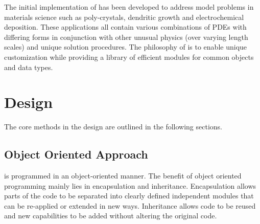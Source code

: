 % 

The initial implementation of \FiPy{} has been developed to address
model problems in materials science such as poly-crystals, dendritic
growth and electrochemical deposition. These applications all contain
various combinations of PDEs with differing forms in conjunction with
other unusual physics (over varying length scales) and unique solution
procedures. The philosophy of \FiPy{} is to enable unique
customization while providing a library of efficient modules for
common objects and data types.

\section{Design}

The core methods in the \FiPy{} design are outlined in the following
sections.

\subsection{Object Oriented Approach}

\FiPy{} is programmed in an object-oriented manner.  The benefit of
object oriented programming mainly lies in encapsulation and
inheritance.  Encapsulation allows parts of the code to be separated
into clearly defined independent modules that can be re-applied or
extended in new ways.  Inheritance allows code to be reused and new
capabilities to be added without altering the original code.

